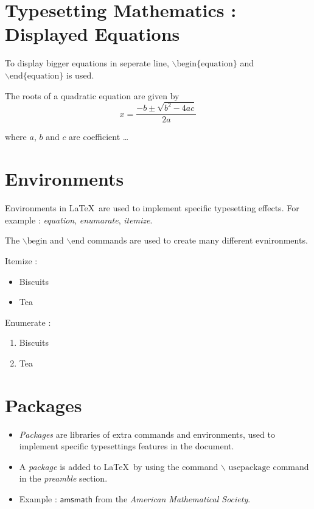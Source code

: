 \documentclass[12pt]{article}
\begin{document}
\section{Typesetting Mathematics : Displayed Equations}

To display bigger equations in seperate line, $\backslash \mathrm{begin} \{\mathrm{equation}\}$ and $\backslash \mathrm{end} \{\mathrm{equation}\}$ is used.

The roots of a quadratic equation are given by
\begin{equation}
x = \frac{-b \pm \sqrt{b^2 - 4ac}}{2a}
\end{equation}

where $a$, $b$ and $c$ are coefficient \ldots

\section{Environments}

Environments in \LaTeX \ are used to implement specific typesetting effects. For example : \emph{equation}, \emph{enumarate}, \emph{itemize}.

The $\backslash \mathrm{begin}$ and $\backslash \mathrm{end}$ commands are used to create many different evnironments.

Itemize : 

\begin{itemize}
\item Biscuits
\item Tea
\end{itemize}

Enumerate : 

\begin{enumerate}
\item Biscuits
\item Tea
\end{enumerate}

\section{Packages}
\begin{itemize}
\item \emph{Packages} are libraries of extra commands and environments, used to implement specific typesettings features in the document.

\item A \emph{package} is added to \LaTeX \ by using the command $\backslash$ $\mathrm{usepackage}$ command in the \emph{preamble} section.

\item Example : $\mathsf{amsmath}$ from the \emph{American Mathematical Society}.

\end{itemize}
\end{document}
